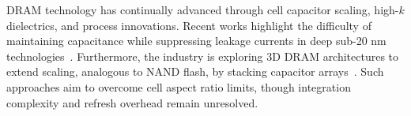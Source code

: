DRAM technology has continually advanced through cell capacitor scaling, high-$k$ dielectrics, and process innovations. 
Recent works highlight the difficulty of maintaining capacitance while suppressing leakage currents in deep sub-20 nm technologies~\cite{choi2022}. 
Furthermore, the industry is exploring 3D DRAM architectures to extend scaling, analogous to NAND flash, by stacking capacitor arrays~\cite{kim2021_dram, iedm2023_dram}. 
Such approaches aim to overcome cell aspect ratio limits, though integration complexity and refresh overhead remain unresolved.
